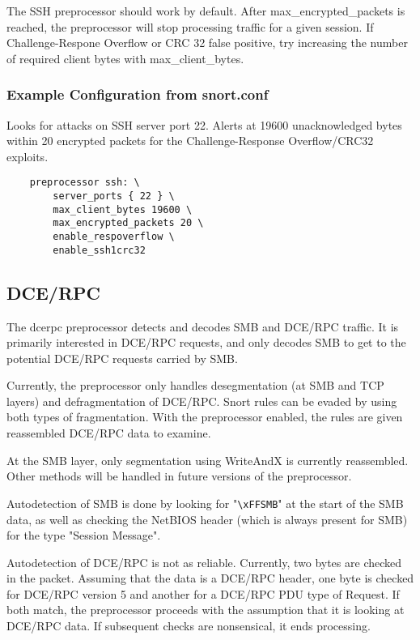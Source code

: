 \documentclass[english]{report}
\begin{document}
The SSH preprocessor should work by default.  After max\_encrypted\_packets is
reached, the preprocessor will stop processing traffic for a given session.  If
Challenge-Respone Overflow or CRC 32 false positive, try increasing the number
of required client bytes with max\_client\_bytes.

\subsubsection{Example Configuration from snort.conf}

Looks for attacks on SSH server port 22.  Alerts at 19600 unacknowledged bytes
within 20 encrypted packets for the Challenge-Response Overflow/CRC32 exploits.

\begin{verbatim}
    preprocessor ssh: \
        server_ports { 22 } \
        max_client_bytes 19600 \
        max_encrypted_packets 20 \
        enable_respoverflow \
        enable_ssh1crc32
\end{verbatim}

\subsection{DCE/RPC}
\label{sub:dcerpc}

The dcerpc preprocessor detects and decodes SMB and DCE/RPC traffic.  It is
primarily interested in DCE/RPC requests, and only decodes SMB to get to the
potential DCE/RPC requests carried by SMB.

Currently, the preprocessor only handles desegmentation (at SMB and TCP layers)
and defragmentation of DCE/RPC.  Snort rules can be evaded by using both types
of fragmentation. With the preprocessor enabled, the rules are given
reassembled DCE/RPC data to examine.

At the SMB layer, only segmentation using WriteAndX is currently reassembled.
Other methods will be handled in future versions of the preprocessor.

Autodetection of SMB is done by looking for "\verb!\xFFSMB!" at the start of
the SMB data, as well as checking the NetBIOS header (which is always present
for SMB) for the type "Session Message".

Autodetection of DCE/RPC is not as reliable.  Currently, two bytes are checked
in the packet.  Assuming that the data is a DCE/RPC header, one byte is checked
for DCE/RPC version 5 and another for a DCE/RPC PDU type of Request.  If both
match, the preprocessor proceeds with the assumption that it is looking at
DCE/RPC data.  If subsequent checks are nonsensical, it ends processing.
\end{document}
